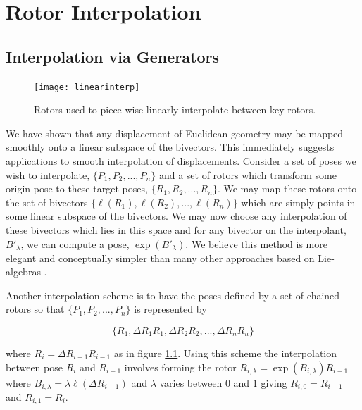 \begin{savequote}
\end{savequote}

\chapter{Rotor Interpolation}

\section{Interpolation via Generators}

\begin{figure}[t]
\centering
\texttt{[image: linearinterp]}
\caption{\label{fig:linearinterp}Rotors used to piece-wise linearly interpolate between key-rotors.}
\end{figure}

We have shown that any displacement of Euclidean geometry
may be mapped smoothly
onto a linear subspace of the bivectors. This immediately suggests applications to smooth interpolation
of displacements. Consider a set of poses we wish to interpolate, $\{P_1, P_2, ..., P_n\}$ and a set
of rotors which transform some origin pose to these target poses, $\{R_1, R_2, ..., R_n\}$. We
may map these rotors onto the set of bivectors $\{\ell(R_1), \ell(R_2), ..., \ell(R_n)\}$ which
are simply points in some linear subspace of the bivectors. We may now choose any interpolation of these bivectors
which lies in this space and for any bivector on the interpolant, $B'_\lambda$, we can compute
a pose, $\exp(B'_\lambda)$. We believe this method is more elegant and conceptually simpler
than many other approaches based on Lie-algebras \cite{LIE:Consistentmotion, LIE:Moak,
  LIE:ROT, LIE:Sphericalfun}.

Another interpolation scheme is to have the poses defined by a set of chained rotors so that
$\{P_1, P_2, ..., P_n\}$ is represented by 

\[\{R_1, \Delta R_1R_1, \Delta R_2 R_2, ..., \Delta R_n R_n\}\]

where $R_i = \Delta R_{i-1} R_{i-1}$ as in figure \ref{fig:linearinterp}. Using
this scheme the interpolation between pose $R_i$ and $R_{i+1}$ involves forming
the rotor $R_{i,\lambda} = \exp(B_{i,\lambda})R_{i-1}$ where $B_{i,\lambda} =
\lambda \ell(\Delta R_{i-1})$ and $\lambda$ varies between $0$ and $1$ giving
$R_{i,0} = R_{i-1}$ and $R_{i,1} = R_i$.

